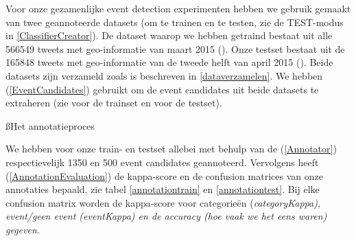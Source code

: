 {{Voor onze gezamenlijke event detection experimenten hebben we gebruik gemaakt van 
twee geannoteerde datasets (om te trainen en te testen, zie de TEST-modus in \ref{ClassifierCreator}).
De dataset waarop we hebben getraind bestaat uit alle 566549 tweets met geo-informatie van
maart 2015 (). Onze testset bestaat uit de 165848 tweets met geo-informatie
van de tweede helft van april 2015 (). Beide datasets zijn verzameld zoals is beschreven in
\ref{dataverzamelen}. We hebben  (\ref{EventCandidates}) gebruikt om de event 
candidates uit beide datasets te extraheren (zie  voor de trainset en 
 voor de testset).

\ss{Het annotatieproces}

We hebben voor onze train- en testset allebei met behulp van de  (\ref{Annotator})
respectievelijk 1350 en 500 event candidates geannoteerd. Vervolgens heeft  (\ref{AnnotationEvaluation}) 
de kappa-score en de confusion matrices van onze annotaties bepaald, zie tabel \ref{annotationtrain} en \ref{annotationtest}.
Bij elke confusion matrix worden de kappa-score voor categorie\"en (\it{categoryKappa}), event/geen event (\it{eventKappa}) en
de \it{accuracy} (hoe vaak we het eens waren) gegeven.

}}
